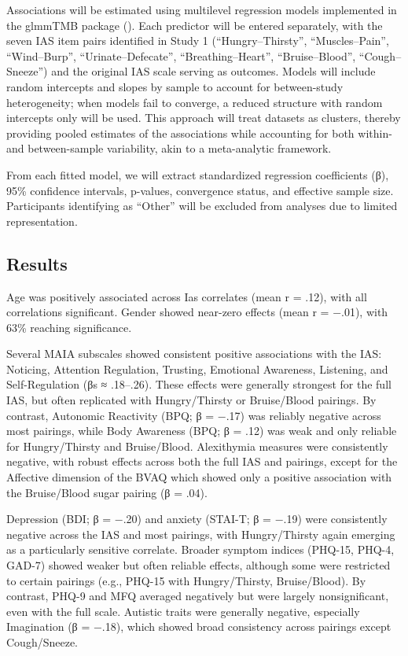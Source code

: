\documentclass[
  jou,
  floatsintext,
  longtable,
  nolmodern,
  notxfonts,
  notimes,
  colorlinks=true,linkcolor=blue,citecolor=blue,urlcolor=blue]{apa7}
\begin{document}
Associations will be estimated using multilevel regression models
implemented in the glmmTMB package (). Each predictor will be entered separately, with the
seven IAS item pairs identified in Study 1 (``Hungry--Thirsty'',
``Muscles--Pain'', ``Wind--Burp'', ``Urinate--Defecate'',
``Breathing--Heart'', ``Bruise--Blood'', ``Cough--Sneeze'') and the
original IAS scale serving as outcomes. Models will include random
intercepts and slopes by sample to account for between-study
heterogeneity; when models fail to converge, a reduced structure with
random intercepts only will be used. This approach will treat datasets
as clusters, thereby providing pooled estimates of the associations
while accounting for both within- and between-sample variability, akin
to a meta-analytic framework.

From each fitted model, we will extract standardized regression
coefficients (β), 95\% confidence intervals, p-values, convergence
status, and effective sample size. Participants identifying as ``Other''
will be excluded from analyses due to limited representation.

\subsection{Results}\label{results-1}

Age was positively associated across Ias correlates (mean r = .12), with
all correlations significant. Gender showed near-zero effects (mean r =
−.01), with 63\% reaching significance.

Several MAIA subscales showed consistent positive associations with the
IAS: Noticing, Attention Regulation, Trusting, Emotional Awareness,
Listening, and Self-Regulation (βs ≈ .18--.26). These effects were
generally strongest for the full IAS, but often replicated with
Hungry/Thirsty or Bruise/Blood pairings. By contrast, Autonomic
Reactivity (BPQ; β = −.17) was reliably negative across most pairings,
while Body Awareness (BPQ; β = .12) was weak and only reliable for
Hungry/Thirsty and Bruise/Blood. Alexithymia measures were consistently
negative, with robust effects across both the full IAS and pairings,
except for the Affective dimension of the BVAQ which showed only a
positive association with the Bruise/Blood sugar pairing (β = .04).

Depression (BDI; β = −.20) and anxiety (STAI-T; β = −.19) were
consistently negative across the IAS and most pairings, with
Hungry/Thirsty again emerging as a particularly sensitive correlate.
Broader symptom indices (PHQ-15, PHQ-4, GAD-7) showed weaker but often
reliable effects, although some were restricted to certain pairings
(e.g., PHQ-15 with Hungry/Thirsty, Bruise/Blood). By contrast, PHQ-9 and
MFQ averaged negatively but were largely nonsignificant, even with the
full scale. Autistic traits were generally negative, especially
Imagination (β = −.18), which showed broad consistency across pairings
except Cough/Sneeze.
\end{document}
